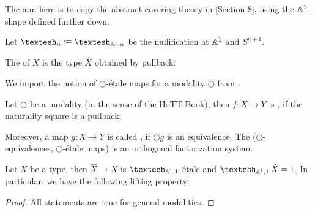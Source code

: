 The aim here is to copy the abstract covering theory in \cite{cherubini_rijke_2021}[Section 8],
using the $\mathbb{A}^1$-shape defined further down.

\begin{definition}
  Let $\shape_n\colonequiv\shape_{\A^1,n}$ be the nullification at $\mathbb{A}^1$ and $S^{n+1}$.
\end{definition}

\begin{definition}
  The  of $X$ is the type $\hat{X}$ obtained by pullback:
  \begin{center}
  \end{center}
\end{definition}

We import the notion of $\bigcirc$-étale maps for a modality $\bigcirc$ from \cite{cherubini_rijke_2021}.

\begin{definition}
  Let $\bigcirc$ be a modality (in the sense of the HoTT-Book),
  then $f:X\to Y$ is , if the naturality square is a pullback:
  \begin{center}
  \end{center}
  Moreover, a map $g:X\to Y$ is called ,
  if $\bigcirc g$ is an equivalence.
  The ($\bigcirc$-equivalences, $\bigcirc$-étale maps) is an orthogonal factorization system. 
\end{definition}

\begin{proposition}
  Let $X$ be a type, then $\hat{X}\to X$ is $\shape_{\A^1,1}$-étale and $\shape_{\A^1,1}\hat{X}=1$.
  In particular, we have the following lifting property:
  \begin{center}
  \end{center}
\end{proposition}

\begin{proof}
  All statements are true for general modalities.
\end{proof}
